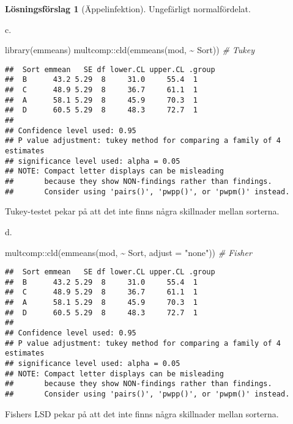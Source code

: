 \documentclass[
]{book}
\newenvironment{Shaded}{\begin{snugshade}}{\end{snugshade}}
\newcommand{\AttributeTok}[1]{\textcolor[rgb]{0.77,0.63,0.00}{#1}}
\newcommand{\CommentTok}[1]{\textcolor[rgb]{0.56,0.35,0.01}{\textit{#1}}}
\newcommand{\FunctionTok}[1]{\textcolor[rgb]{0.00,0.00,0.00}{#1}}
\newcommand{\NormalTok}[1]{#1}
\newcommand{\SpecialCharTok}[1]{\textcolor[rgb]{0.00,0.00,0.00}{#1}}
\newcommand{\StringTok}[1]{\textcolor[rgb]{0.31,0.60,0.02}{#1}}
\theoremstyle{definition}
\theoremstyle{definition}
\theoremstyle{definition}
\theoremstyle{definition}
\newtheorem{hypothesis}{Lösningsförslag}[chapter]
\theoremstyle{remark}
\begin{document}
\begin{hypothesis}[Äppelinfektion]
Ungefärligt normalfördelat.

c.

\begin{Shaded}
\begin{Highlighting}[]
\FunctionTok{library}\NormalTok{(emmeans)}
\NormalTok{multcomp}\SpecialCharTok{::}\FunctionTok{cld}\NormalTok{(}\FunctionTok{emmeans}\NormalTok{(mod, }\SpecialCharTok{\textasciitilde{}}\NormalTok{ Sort)) }\CommentTok{\# Tukey}
\end{Highlighting}
\end{Shaded}

\begin{verbatim}
##  Sort emmean   SE df lower.CL upper.CL .group
##  B      43.2 5.29  8     31.0     55.4  1    
##  C      48.9 5.29  8     36.7     61.1  1    
##  A      58.1 5.29  8     45.9     70.3  1    
##  D      60.5 5.29  8     48.3     72.7  1    
## 
## Confidence level used: 0.95 
## P value adjustment: tukey method for comparing a family of 4 estimates 
## significance level used: alpha = 0.05 
## NOTE: Compact letter displays can be misleading
##       because they show NON-findings rather than findings.
##       Consider using 'pairs()', 'pwpp()', or 'pwpm()' instead.
\end{verbatim}

Tukey-testet pekar på att det inte finns några skillnader mellan sorterna.

d.

\begin{Shaded}
\begin{Highlighting}[]
\NormalTok{multcomp}\SpecialCharTok{::}\FunctionTok{cld}\NormalTok{(}\FunctionTok{emmeans}\NormalTok{(mod, }\SpecialCharTok{\textasciitilde{}}\NormalTok{ Sort, }\AttributeTok{adjust =} \StringTok{"none"}\NormalTok{)) }\CommentTok{\# Fisher}
\end{Highlighting}
\end{Shaded}

\begin{verbatim}
##  Sort emmean   SE df lower.CL upper.CL .group
##  B      43.2 5.29  8     31.0     55.4  1    
##  C      48.9 5.29  8     36.7     61.1  1    
##  A      58.1 5.29  8     45.9     70.3  1    
##  D      60.5 5.29  8     48.3     72.7  1    
## 
## Confidence level used: 0.95 
## P value adjustment: tukey method for comparing a family of 4 estimates 
## significance level used: alpha = 0.05 
## NOTE: Compact letter displays can be misleading
##       because they show NON-findings rather than findings.
##       Consider using 'pairs()', 'pwpp()', or 'pwpm()' instead.
\end{verbatim}

Fishers LSD pekar på att det inte finns några skillnader mellan sorterna.
\end{hypothesis}
\end{document}
